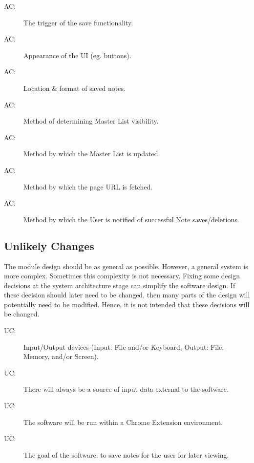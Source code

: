 \documentclass[12pt, titlepage]{article}
\newcounter{acnum}
\newcommand{\actheacnum}{AC\theacnum}
\newcounter{ucnum}
\newcommand{\uctheucnum}{UC\theucnum}
\begin{document}
\begin{description}
\item[ \actheacnum \label{acTrigger}:] The trigger of 
the save functionality.
\item[ \actheacnum \label{acUI}:] Appearance of the UI 
(eg. buttons).
\item[ \actheacnum \label{acSave}:] Location \& format of 
saved notes.
\item[ \actheacnum \label{acVisibility}:] Method of 
determining Master List visibility.
\item[ \actheacnum \label{acUpdate}:] Method by which the 
Master List is updated.
\item[ \actheacnum \label{acURL}:] Method by which the 
page URL is fetched.
\item[ \actheacnum \label{acNotify}:] Method by which the 
User is notified of successful Note saves/deletions.
\end{description}

\subsection{Unlikely Changes} \label{SecUchange}

The module design should be as general as possible. However, a general system is
more complex. Sometimes this complexity is not necessary. Fixing some design
decisions at the system architecture stage can simplify the software design. If
these decision should later need to be changed, then many parts of the design
will potentially need to be modified. Hence, it is not intended that these
decisions will be changed.

\begin{description}
\item[ \uctheucnum \label{ucIO}:] Input/Output devices
  (Input: File and/or Keyboard, Output: File, Memory, and/or Screen).
\item[ \uctheucnum \label{ucInput}:] There will always be
  a source of input data external to the software.
\item[ \uctheucnum \label{ucChrome}:] The software will 
  be run within a Chrome Extension environment.
\item[ \uctheucnum \label{ucGoal}:] The goal of the 
software: to save notes for the user for later viewing. 
\end{description}
\end{document}
